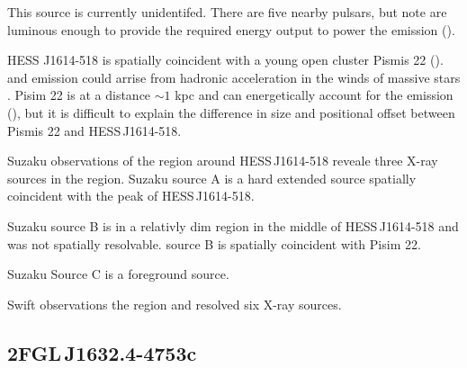 \documentclass[12pt,preprint]{aastex}
\newcommand{\gev}{\text{GeV}\xspace}
\newcommand{\tev}{\text{TeV}\xspace}
\renewcommand{\approx}{\sim\!\xspace}
\begin{document}
This source is currently unidentifed. There are five nearby pulsars,
but note are luminous enough to provide the required energy output
to power the \tev emission (\cite{closer_look_hess_j1614-518}).

HESS J1614-518 is spatially coincident with a young open cluster Pismis
22 (\cite{hess_1614_landi_atel,closer_look_hess_j1614-518}).
\gev and \tev emission could arrise from
hadronic acceleration in the winds of massive stars
\cite{cosmic_rays_and_gamma-rays_from_ob_stars,gamma-ray_production_in_young_open_clusters}.
Pisim 22 is at a distance $\approx1$ kpc and can energetically account
for the \tev emission (\cite{closer_look_hess_j1614-518}), but
it is difficult to explain the difference in size and positional offset
between Pismis 22 and HESS\,J1614-518.


Suzaku observations of the region around HESS\,J1614-518 reveale three
X-ray sources in the region. Suzaku source A is a hard extended source
spatially coincident with the peak of HESS\,J1614-518. 

Suzaku source B is
in a relativly dim region in the middle of HESS\,J1614-518 and was not
spatially resolvable. source B is spatially coincident with Pisim 22.

Suzaku Source C is a foreground source.

Swift observations the region and resolved six X-ray sources.





\subsection{2FGL\,J1632.4-4753c}
\label{section_2FGL_J1632.4-4753c}


\end{document}
